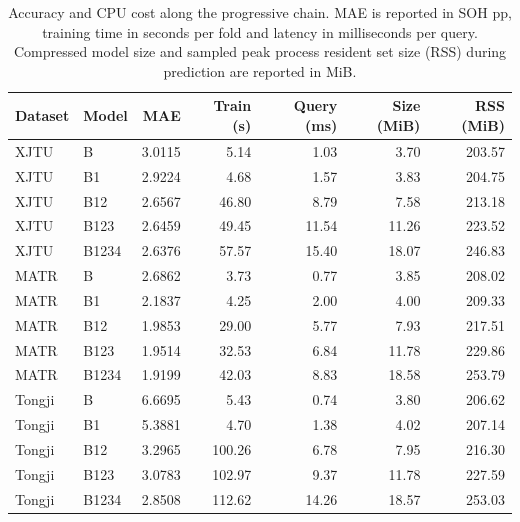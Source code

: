 \begin{table}[!htbp]\renewcommand{\arraystretch}{1.15}
\centering
\caption{Accuracy and CPU cost along the progressive chain. MAE is reported in SOH pp, training time in seconds per fold and latency in milliseconds per query. Compressed model size and sampled peak process resident set size (RSS) during prediction are reported in MiB.}
\label{tab:complexity}
\papertablesize
\setlength{\tabcolsep}{4pt}
%
\begin{tabular}{llrrrrr}
\toprule
Dataset & Model & MAE & Train (s) & Query (ms) & Size (MiB) & RSS (MiB) \\
\midrule
XJTU & B & 3.0115 & 5.14 & 1.03 & 3.70 & 203.57 \\
XJTU & B1 & 2.9224 & 4.68 & 1.57 & 3.83 & 204.75 \\
XJTU & B12 & 2.6567 & 46.80 & 8.79 & 7.58 & 213.18 \\
XJTU & B123 & 2.6459 & 49.45 & 11.54 & 11.26 & 223.52 \\
XJTU & B1234 & 2.6376 & 57.57 & 15.40 & 18.07 & 246.83 \\
\midrule
MATR & B & 2.6862 & 3.73 & 0.77 & 3.85 & 208.02 \\
MATR & B1 & 2.1837 & 4.25 & 2.00 & 4.00 & 209.33 \\
MATR & B12 & 1.9853 & 29.00 & 5.77 & 7.93 & 217.51 \\
MATR & B123 & 1.9514 & 32.53 & 6.84 & 11.78 & 229.86 \\
MATR & B1234 & 1.9199 & 42.03 & 8.83 & 18.58 & 253.79 \\
\midrule
Tongji & B & 6.6695 & 5.43 & 0.74 & 3.80 & 206.62 \\
Tongji & B1 & 5.3881 & 4.70 & 1.38 & 4.02 & 207.14 \\
Tongji & B12 & 3.2965 & 100.26 & 6.78 & 7.95 & 216.30 \\
Tongji & B123 & 3.0783 & 102.97 & 9.37 & 11.78 & 227.59 \\
Tongji & B1234 & 2.8508 & 112.62 & 14.26 & 18.57 & 253.03 \\
\bottomrule
\end{tabular}

\end{table}
